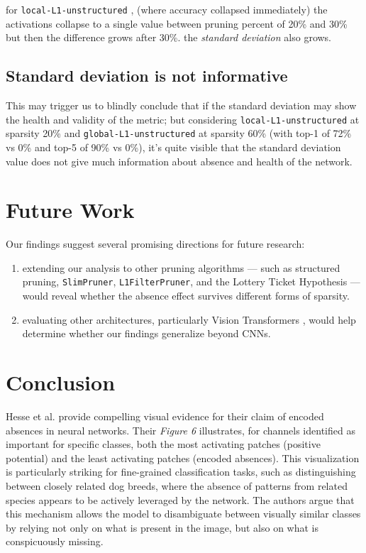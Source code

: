 for \texttt{local-L1-unstructured} , (where accuracy collapsed immediately) the activations collapse to a single value between pruning percent of 20\% and 30\% but then the difference grows after 30\%. the \textit{standard deviation} also grows.

\subsection{\textbf{Standard deviation is not informative}}

This may trigger us to blindly conclude that if the standard deviation may show the health and validity of the metric; but considering \texttt{local-L1-unstructured} at sparsity 20\% and \texttt{global-L1-unstructured} at sparsity 60\% (with top-1 of 72\% vs 0\% and top-5 of 90\% vs 0\%), it's quite visible that the standard deviation value does not give much information about absence and health of the network.

\section{\textbf{Future Work}}

Our findings suggest several promising directions for future research:

\begin{enumerate}
\item extending our analysis to other pruning algorithms — such as structured pruning, \texttt{SlimPruner}, \texttt{L1FilterPruner}, and the Lottery Ticket Hypothesis \cite{lottery} — would reveal whether the absence effect survives different forms of sparsity.
\item evaluating other architectures, particularly Vision Transformers \cite{vit}, would help determine whether our findings generalize beyond CNNs.
\end{enumerate}

\section{\textbf{Conclusion}}

Hesse et al. \cite{whatismissing} provide compelling visual evidence for their claim of encoded absences in neural networks. Their \textit{Figure 6} illustrates, for channels identified as important for specific classes, both the most activating patches (positive potential) and the least activating patches (encoded absences). This visualization is particularly striking for fine-grained classification tasks, such as distinguishing between closely related dog breeds, where the absence of patterns from related species appears to be actively leveraged by the network. The authors argue that this mechanism allows the model to disambiguate between visually similar classes by relying not only on what is present in the image, but also on what is conspicuously missing.

